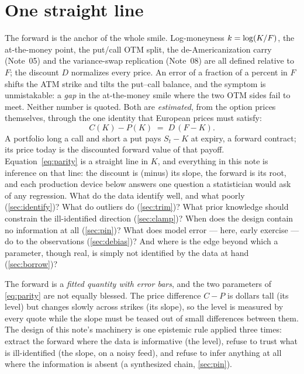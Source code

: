 \documentclass[11pt]{article}
\begin{document}
\newpage
\tableofcontents
\newpage

\section{One straight line}
\label{sec:line}

The forward is the anchor of the whole smile.  Log-moneyness
$k=\log(K/F)$, the at-the-money point, the put/call OTM split, the
de-Americanization carry (Note~05) and the variance-swap replication
(Note~08) are all defined relative to $F$; the discount $D$ normalizes
every price.  An error of a fraction of a percent in $F$ shifts the ATM
strike and tilts the put--call balance, and the symptom is unmistakable: a
\emph{gap} in the at-the-money smile where the two OTM sides fail to meet.
Neither number is quoted.  Both are \emph{estimated}, from the option
prices themselves, through the one identity that European prices must
satisfy:
\begin{equation}
\boxed{\;C(K)-P(K)\;=\;D\,(F-K).\;}
\label{eq:parity}
\end{equation}
A portfolio long a call and short a put pays $S_t-K$ at expiry, a forward
contract; its price today is the discounted forward value of that payoff.
Equation~\eqref{eq:parity} is a straight line in $K$, and everything in
this note is inference on that line: the discount is (minus) its slope,
the forward is its root, and each production device below answers one
question a statistician would ask of any regression.  What do the data
identify well, and what poorly (\cref{sec:identify})?  What do outliers do
(\cref{sec:trim})?  What prior knowledge should constrain the
ill-identified direction (\cref{sec:clamp})?  When does the design contain
no information at all (\cref{sec:pin})?  What does model error --- here,
early exercise --- do to the observations (\cref{sec:debias})?  And where
is the edge beyond which a parameter, though real, is simply not
identified by the data at hand (\cref{sec:borrow})?

\begin{heuristic}
The forward is a \emph{fitted quantity with error bars}, and the two
parameters of \eqref{eq:parity} are not equally blessed.  The price
difference $C-P$ is dollars tall (its level) but changes slowly across
strikes (its slope), so the level is measured by every quote while the
slope must be teased out of small differences between them.  The design of
this note's machinery is one epistemic rule applied three times: extract
the forward where the data is informative (the level), refuse to trust
what is ill-identified (the slope, on a noisy feed), and refuse to infer
anything at all where the information is absent (a synthesized chain,
\cref{sec:pin}).
\end{heuristic}
\end{document}
